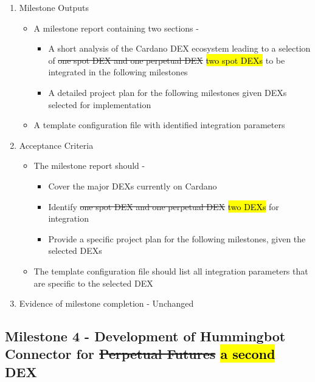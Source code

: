 \documentclass{article}
\begin{document}
\begin{enumerate}
    \item Milestone Outputs
    \begin{itemize}
        \item A milestone report containing two sections - 
        \begin{itemize}
            \item A short analysis of the Cardano DEX ecosystem leading to a selection of \st{one spot DEX and one perpetual DEX} \hl{two spot DEXs} to be integrated in the following milestones
            \item A detailed project plan for the following milestones given DEXs selected for implementation
        \end{itemize}        
        \item  A template configuration file with identified integration parameters
    \end{itemize}    

    \item Acceptance Criteria
    \begin{itemize}
        \item The milestone report should - \begin{itemize}
            \item Cover the major DEXs currently on Cardano 
            \item Identify \st{one spot DEX and one perpetual DEX} \hl{two DEXs} for integration
            \item Provide a specific project plan for the following milestones, given the selected DEXs
        \end{itemize}        
        \item  The template configuration file should list all integration parameters that are specific to the selected DEX 
    \end{itemize}
    
    \item Evidence of milestone completion - Unchanged
\end{enumerate}


\subsection*{Milestone 4 - Development of Hummingbot Connector for \st{Perpetual Futures} \hl{a second} DEX}
\end{document}
